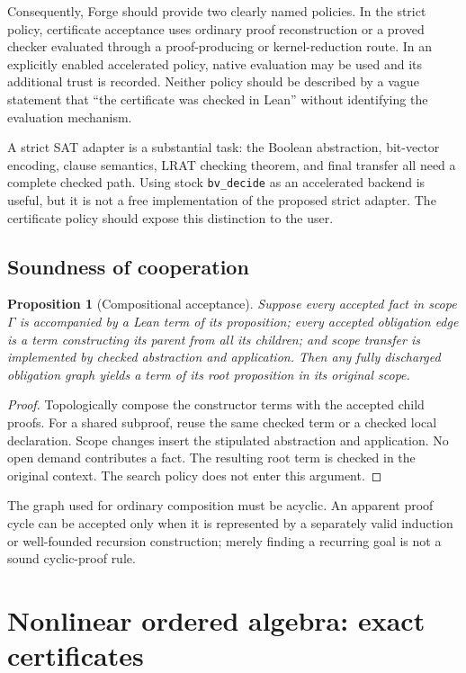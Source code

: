 \documentclass[11pt,letterpaper]{article}
\newcommand{\Lean}{\textsf{Lean}}
\newcommand{\Forge}{\textsf{Forge}}
\newtheorem{proposition}{Proposition}[section]
\theoremstyle{definition}
\theoremstyle{remark}
\begin{document}
Consequently, \Forge{} should provide two clearly named policies. In the strict policy, certificate acceptance uses ordinary proof reconstruction or a proved checker evaluated through a proof-producing or kernel-reduction route. In an explicitly enabled accelerated policy, native evaluation may be used and its additional trust is recorded. Neither policy should be described by a vague statement that ``the certificate was checked in Lean'' without identifying the evaluation mechanism.

A strict SAT adapter is a substantial task: the Boolean abstraction, bit-vector encoding, clause semantics, LRAT checking theorem, and final transfer all need a complete checked path. Using stock \texttt{bv\_decide} as an accelerated backend is useful, but it is not a free implementation of the proposed strict adapter. The certificate policy should expose this distinction to the user.

\subsection{Soundness of cooperation}
\begin{proposition}[Compositional acceptance]
Suppose every accepted fact in scope $\Gamma$ is accompanied by a \Lean{} term of its proposition; every accepted obligation edge is a term constructing its parent from all its children; and scope transfer is implemented by checked abstraction and application. Then any fully discharged obligation graph yields a term of its root proposition in its original scope.
\end{proposition}
\begin{proof}
Topologically compose the constructor terms with the accepted child proofs. For a shared subproof, reuse the same checked term or a checked local declaration. Scope changes insert the stipulated abstraction and application. No open demand contributes a fact. The resulting root term is checked in the original context. The search policy does not enter this argument.
\end{proof}
The graph used for ordinary composition must be acyclic. An apparent proof cycle can be accepted only when it is represented by a separately valid induction or well-founded recursion construction; merely finding a recurring goal is not a sound cyclic-proof rule.

\section{Nonlinear ordered algebra: exact certificates}
\end{document}
